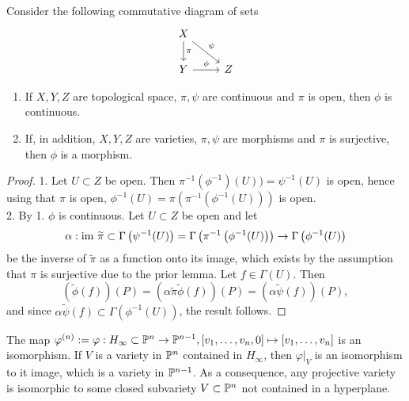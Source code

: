     \begin{lemma}\label{DescentingMorphismToMorphismViaOpenSurjectiveMorphism}
        Consider the following commutative diagram of sets
        $$
            \begin{tikzcd}
                X \arrow[d, "\pi"] \arrow[rd, "\psi"] \\
                Y \arrow[r, "\phi"] & Z
            \end{tikzcd}
        $$
        \begin{enumerate}
            \item If $X,Y,Z$ are topological space, $\pi,\psi$ are continuous and $\pi$ is open, then $\phi$ is continuous.
            \item If, in addition, $X,Y,Z$ are varieties, $\pi,\psi$ are morphisms and $\pi$ is surjective, then $\phi$ is a morphism. 
        \end{enumerate}
    \end{lemma}
    \begin{proof}
        1. Let $U\subset Z$ be open. Then $\pi^{-1}(\phi^{-1})(U))=\psi^{-1}(U)$ is open, hence using that $\pi$ is open, $\phi^{-1}(U)= \pi(\pi^{-1}(\phi^{-1}(U)))$ is open.\\
        2. By 1. $\phi$ is continuous. Let $U\subset Z$ be open and let 
        $$\alpha: \im\ \widetilde{\pi}\subset \Gamma\left(\psi^{-1}(U)\right)=\Gamma\left(\pi^{-1}\left(\phi^{-1}(U)\right)\right)\rightarrow \Gamma\left(\phi^{-1}(U)\right)$$
        be the inverse of $\widetilde{\pi}$ as a function onto its image, which exists by the assumption that $\pi$ is surjective due to the prior lemma. Let $f\in \Gamma(U)$. Then 
        $$(\widetilde{\phi}(f))(P) = (\alpha\widetilde{\pi}\widetilde{\phi}(f))(P)= (\alpha\widetilde{\psi}(f))(P),$$
        and since $\alpha\widetilde{\psi}(f)\subset \Gamma\left(\phi^{-1}(U)\right)$, the result follows. 
    \end{proof}
    \begin{lemma}\label{WeMayAssumeProjectiveVarietyNotContainedInHyperPlane}
        The map $\varphi^{(n)}:= \varphi: H_\infty \subset \mathbb{P}^n \rightarrow \mathbb{P}^{n-1}, [v_1,\dots,v_n,0]\mapsto [v_1,\dots,v_n]$ is an isomorphism. If $V$ is a variety in $\mathbb{P}^n$ contained in $H_\infty$, then $\left.\varphi\right|_{V}$ is an isomorphism to it image, which is a variety in $\mathbb{P}^{n-1}$. As a consequence, any projective variety is isomorphic to some closed subvariety $V\subset \mathbb{P}^n$ not contained in a hyperplane. 
    \end{lemma}
